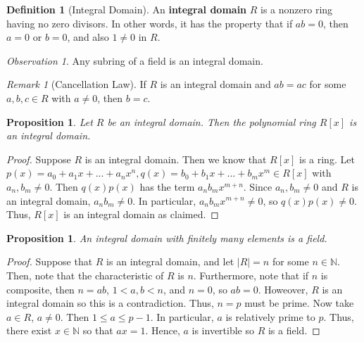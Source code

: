 \documentclass[12pt]{article}
\newtheorem{prop}[thm]{Proposition}
\theoremstyle{definition}
\newtheorem{defn}[thm]{Definition}
\theoremstyle{remark}
\newtheorem{rmk}[thm]{Remark}
\newtheorem{obs}[thm]{Observation}
\numberwithin{equation}{section}
\newcommand\N{\mathbb N}    %
\newcommand\B[1]{\textbf{ #1}}
\begin{document}
\vspace{15pt}

\begin{defn}[Integral Domain]
        An \B{integral domain} $R$ is a nonzero ring having no zero divisors. In other words, it has the property that if $ab = 0$, then $a=0$ or $b=0$, and also $1\neq 0$ in $R$. 
\end{defn}


\vspace{15pt}

\begin{obs}
        Any subring of a field is an integral domain.
\end{obs}

\vspace{15pt}

\begin{rmk}[Cancellation Law]
        If $R$ is an integral domain and $ab = ac$ for some $a,b,c \in R$ with $a\neq 0$, then $b = c$.
\end{rmk}


\vspace{15pt}

\begin{prop}
        Let $R$ be an integral domain. Then the polynomial ring $R[x]$ is an integral domain.
\end{prop}
\begin{proof}
        Suppose $R$ is an integral domain. Then we know that $R[x]$ is a ring. Let $p(x) = a_0+a_1x+...+a_nx^n,q(x) = b_0 + b_1x+...+b_mx^m \in R[x]$ with $a_n,b_m \neq 0$. Then $q(x)p(x)$ has the term $a_nb_mx^{m+n}$. Since $a_n,b_m \neq 0$ and $R$ is an integral domain, $a_nb_m \neq 0$. In particular, $a_nb_mx^{m+n} \neq 0$, so $q(x)p(x) \neq 0$. Thus, $R[x]$ is an integral domain as claimed.
\end{proof}




\vspace{15pt}

\begin{prop}
        An integral domain with finitely many elements is a field.
\end{prop}
\begin{proof}
        Suppose that $R$ is an integral domain, and let $|R| = n$ for some $n \in \N$. Then, note that the characteristic of $R$ is $n$. Furthermore, note that if $n$ is composite, then $n = ab$, $1 < a,b < n$, and $n = 0$, so $ab = 0$. Howeover, $R$ is an integral domain so this is a contradiction. Thus, $n= p$ must be prime. Now take $a \in R$, $a \neq 0$. Then $1 \leq a \leq p-1$. In particular, $a$ is relatively prime to $p$. Thus, there exist $x \in \N$ so that $ax = 1$. Hence, $a$ is invertible so $R$ is a field.
\end{proof}
\end{document}
